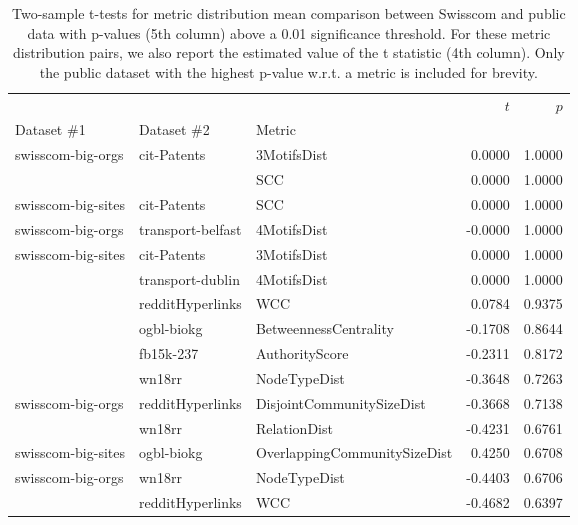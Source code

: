 \begin{table}[ht!]
    \centering
    \caption[Two-sample t-tests for metric distribution mean comparison between Swisscom and public data.]{Two-sample t-tests for metric distribution mean comparison between Swisscom and public data with p-values (5th column) above a 0.01 significance threshold. For these metric distribution pairs, we also report the estimated value of the t statistic (4th column). Only the public dataset with the highest p-value w.r.t. a metric is included for brevity.}
    \label{tab:t}
\begin{adjustbox}{width=0.8\columnwidth}
\begin{tabular}{lllrr}
\toprule
                   &                   &          &   $t$ &  $p$ \\
Dataset \#1 & Dataset \#2 & Metric &         &              \\
\midrule
swisscom-big-orgs & cit-Patents & 3MotifsDist &  0.0000 &       1.0000 \\
                   &                   & SCC &  0.0000 &       1.0000 \\
swisscom-big-sites & cit-Patents & SCC &  0.0000 &       1.0000 \\
swisscom-big-orgs & transport-belfast & 4MotifsDist & -0.0000 &       1.0000 \\
swisscom-big-sites & cit-Patents & 3MotifsDist &  0.0000 &       1.0000 \\
                   & transport-dublin & 4MotifsDist &  0.0000 &       1.0000 \\
                   & redditHyperlinks & WCC &  0.0784 &       0.9375 \\
                   & ogbl-biokg & BetweennessCentrality & -0.1708 &       0.8644 \\
                   & fb15k-237 & AuthorityScore & -0.2311 &       0.8172 \\
                   & wn18rr & NodeTypeDist & -0.3648 &       0.7263 \\
swisscom-big-orgs & redditHyperlinks & DisjointCommunitySizeDist & -0.3668 &       0.7138 \\
                   & wn18rr & RelationDist & -0.4231 &       0.6761 \\
swisscom-big-sites & ogbl-biokg & OverlappingCommunitySizeDist &  0.4250 &       0.6708 \\
swisscom-big-orgs & wn18rr & NodeTypeDist & -0.4403 &       0.6706 \\
                   & redditHyperlinks & WCC & -0.4682 &       0.6397 \\

\end{tabular}
\end{adjustbox}
\end{table}
